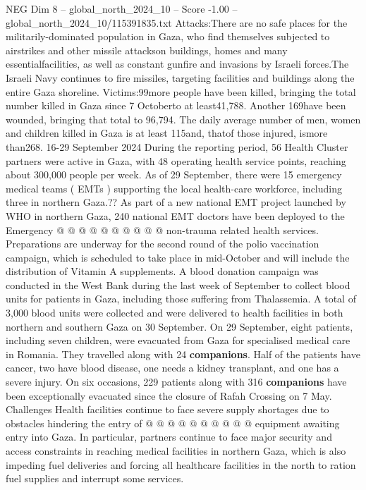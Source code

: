 \begin{textsample}{NEG Dim 8 – global\_north\_2024\_10 – Score -1.00 – global\_north\_2024\_10/115391835.txt}  \label{ex:f8_neg_292}
Attacks:There are no safe places for the militarily-dominated population in Gaza, who find themselves subjected to airstrikes and other missile attackson buildings, homes and many essentialfacilities, as well as constant gunfire and invasions by Israeli forces.The Israeli Navy continues to fire missiles, targeting facilities and buildings along the entire Gaza shoreline.
Victims:99more people have been killed, bringing the total number killed in Gaza since 7 Octoberto at least41,788.
Another 169have been wounded, bringing that total to 96,794.
The daily average number of men, women and children killed in Gaza is at least 115and, thatof those injured, ismore than268. 16-29 September 2024 During the reporting period, 56 Health Cluster partners were active in Gaza, with 48 operating health service points, reaching about 300,000 people per week.
As of 29 September, there were 15 emergency medical teams ( EMTs ) supporting the local health-care workforce, including three in northern Gaza.??
As part of a new national EMT project launched by WHO in northern Gaza, 240 national EMT doctors have been deployed to the Emergency @ @ @ @ @ @ @ @ @ @ non-trauma related health services.
Preparations are underway for the second round of the polio vaccination campaign, which is scheduled to take place in mid-October and will include the distribution of Vitamin A supplements.
A blood donation campaign was conducted in the West Bank during the last week of September to collect blood units for patients in Gaza, including those suffering from Thalassemia.
A total of 3,000 blood units were collected and were delivered to health facilities in both northern and southern Gaza on 30 September.
On 29 September, eight patients, including seven children, were evacuated from Gaza for specialised medical care in Romania.
They travelled along with 24 \textbf{companions}.
Half of the patients have cancer, two have blood disease, one needs a kidney transplant, and one has a severe injury.
On six occasions, 229 patients along with 316 \textbf{companions} have been exceptionally evacuated since the closure of Rafah Crossing on 7 May.
Challenges Health facilities continue to face severe supply shortages due to obstacles hindering the entry of @ @ @ @ @ @ @ @ @ @ equipment awaiting entry into Gaza.
In particular, partners continue to face major security and access constraints in reaching medical facilities in northern Gaza, which is also impeding fuel deliveries and forcing all healthcare facilities in the north to ration fuel supplies and interrupt some services.

\end{textsample}

